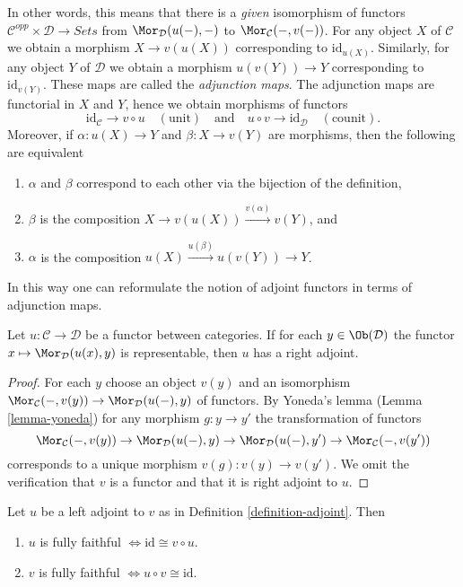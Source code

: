 \noindent
In other words, this means that there is a {\it given} isomorphism of functors
$\mathcal{C}^{opp} \times \mathcal{D} \to \textit{Sets}$ from
$\Mor_\mathcal{D}(u(-), -)$ to $\Mor_\mathcal{C}(-, v(-))$. For any object
$X$ of $\mathcal{C}$ we obtain a morphism $X \to v(u(X))$ corresponding to
$\text{id}_{u(X)}$. Similarly, for any object $Y$ of $\mathcal{D}$ we obtain
a morphism $u(v(Y)) \to Y$ corresponding to $\text{id}_{v(Y)}$.
These maps are called the {\it adjunction maps}. The adjunction maps
are functorial in $X$ and $Y$, hence we obtain morphisms of functors
$$
\text{id}_\mathcal{C} \to v \circ u\quad (\text{unit})
\quad\text{and}\quad
u \circ v \to \text{id}_\mathcal{D}\quad (\text{counit}).
$$
Moreover, if $\alpha : u(X) \to Y$
and $\beta : X \to v(Y)$ are morphisms, then the following are equivalent
\begin{enumerate}
\item $\alpha$ and $\beta$ correspond to each other via the
bijection of the definition,
\item $\beta$ is the composition $X \to v(u(X)) \xrightarrow{v(\alpha)} v(Y)$,
and
\item $\alpha$ is the composition $u(X) \xrightarrow{u(\beta)} u(v(Y)) \to Y$.
\end{enumerate}
In this way one can reformulate the notion of adjoint functors in terms
of adjunction maps.

\begin{lemma}
\label{lemma-adjoint-exists}
Let $u : \mathcal{C} \to \mathcal{D}$ be a functor between categories.
If for each $y \in \Ob(\mathcal{D})$ the functor
$x \mapsto \Mor_\mathcal{D}(u(x), y)$ is representable, then
$u$ has a right adjoint.
\end{lemma}

\begin{proof}
For each $y$ choose an object $v(y)$ and an isomorphism
$\Mor_\mathcal{C}(-, v(y)) \to \Mor_\mathcal{D}(u(-), y)$
of functors. By Yoneda's lemma (Lemma \ref{lemma-yoneda})
for any morphism $g : y \to y'$ the transformation of functors
$$
\Mor_\mathcal{C}(-, v(y)) \to \Mor_\mathcal{D}(u(-), y) \to
\Mor_\mathcal{D}(u(-), y') \to \Mor_\mathcal{C}(-, v(y'))
$$
corresponds to a unique morphism $v(g) : v(y) \to v(y')$.
We omit the verification that $v$ is a functor and that
it is right adjoint to $u$.
\end{proof}

\begin{lemma}
\label{lemma-adjoint-fully-faithful}
Let $u$ be a left adjoint to $v$ as in Definition \ref{definition-adjoint}.
Then
\begin{enumerate}
\item $u$ is fully faithful $\Leftrightarrow \text{id} \cong v \circ u$.
\item $v$ is fully faithful $\Leftrightarrow u \circ v \cong \text{id}$.
\end{enumerate}
\end{lemma}

